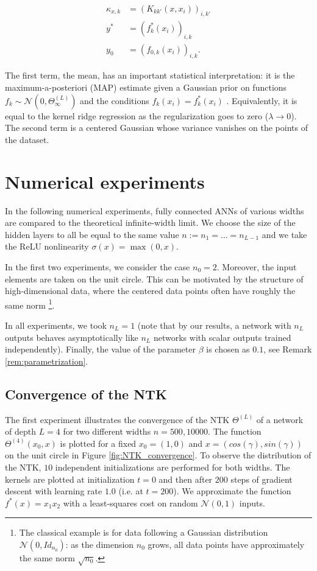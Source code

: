 \begin{align*}
\kappa_{x, k} & = \left(K_{kk'}(x, x_i)\right)_{i, k'} \\
y^* & = \left(f^*_k(x_i)\right)_{i, k} \\
y_0 & = \left(f_{0, k}(x_i)\right)_{i, k}.
\end{align*}

The first term, the mean, has an important statistical interpretation: it is the maximum-a-posteriori (MAP) estimate given a Gaussian prior on functions $f_k\sim \mathcal{N}(0, \Theta^{(L)}_\infty)$  and the conditions $f_k(x_i)=f^*_k(x_i)$ . Equivalently, it is equal to the kernel ridge regression \cite{Shawe-Taylor} as the regularization goes to zero ($\lambda \to 0$). The second term is a centered Gaussian whose variance vanishes on the points of the dataset.

\section{Numerical experiments} \label{sec:numerical-experiments}
In the following numerical experiments, fully connected ANNs of various widths are compared to the theoretical infinite-width limit. We choose the size of the hidden layers to all be equal to the same value $n := n_1 = ... = n_{L-1}$ and we take the ReLU nonlinearity $\sigma(x)=\max(0,x)$. 

In the first two experiments, we consider the case $n_0=2$. Moreover, the input elements are taken on the unit circle. This can be motivated by the structure of high-dimensional data, where the centered data points often have roughly the same norm \footnote{The classical example is for data following a Gaussian distribution $\mathcal{N}(0, Id_{n_0})$: as the dimension $n_0$ grows, all data points have approximately the same norm $\sqrt{n_0}$.}.

In all experiments, we took $n_L = 1$ (note that by our results, a network with $n_L$ outputs behaves asymptotically like $n_L$ networks with scalar outputs trained independently). Finally, the value of the parameter $\beta$ is chosen as $0.1$, see Remark \ref{rem:parametrization}.

\subsection{Convergence of the NTK} The first experiment illustrates the convergence of the NTK $\Theta^{(L)}$ of a network of depth $L=4$ for two different widths $n=500, 10000$. The function $\Theta^{(4)}(x_0, x)$ is plotted for a fixed $x_0=(1, 0)$ and $x=(cos(\gamma), sin(\gamma))$ on the unit circle in Figure \ref{fig:NTK_convergence}. To observe the distribution of the NTK, $10$ independent initializations are performed for both widths. The kernels are plotted at initialization $t=0$ and then after $200$ steps of gradient descent with learning rate $1.0$ (i.e. at $t=200$). We approximate the function $f^*(x) = x_1 x_2$ with a least-squares cost on random $\mathcal{N}(0, 1)$ inputs.

